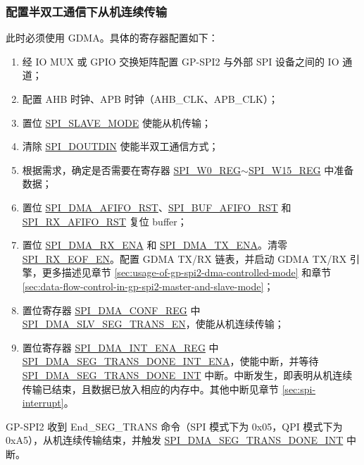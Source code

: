 \documentclass[main\_\_CN.tex]{subfiles}
\begin{document}
\subsubsection{配置半双工通信下从机连续传输}\label{sec:gp-spi2-slave-hd-seg-trans}

此时必须使用 GDMA。具体的寄存器配置如下：

\begin{enumerate}
    \item 经 IO MUX 或 GPIO 交换矩阵配置 GP-SPI2 与外部 SPI 设备之间的 IO 通道；
    \item 配置 AHB 时钟、APB 时钟（AHB\_CLK、APB\_CLK）；
    \item 置位 \hyperref[fielddesc:SPISLAVEMODE]{SPI\_SLAVE\_MODE} 使能从机传输； 
    \item 清除 \hyperref[fielddesc:SPIDOUTDIN]{SPI\_DOUTDIN} 使能半双工通信方式；
    \item 根据需求，确定是否需要在寄存器 \hyperref[regdesc:SPIW0REG]{SPI\_W0\_REG}$\sim$\hyperref[regdesc:SPIW15REG]{SPI\_W15\_REG} 中准备数据；
    \item 置位 \hyperref[fielddesc:SPIDMAAFIFORST]{SPI\_DMA\_AFIFO\_RST}、\hyperref[fielddesc:SPIBUFAFIFORST]{SPI\_BUF\_AFIFO\_RST} 和 \hyperref[fielddesc:SPIRXAFIFORST]{SPI\_RX\_AFIFO\_RST} 复位 buffer；
    \item 置位 \hyperref[fielddesc:SPIDMARXENA]{SPI\_DMA\_RX\_ENA} 和 \hyperref[fielddesc:SPIDMATXENA]{SPI\_DMA\_TX\_ENA}。清零 \hyperref[fielddesc:SPIRXEOFEN]{SPI\_RX\_EOF\_EN}。配置 GDMA TX/RX 链表，并启动 GDMA TX/RX 引擎，更多描述见章节 \ref{sec:usage-of-gp-spi2-dma-controlled-mode} 和章节 \ref{sec:data-flow-control-in-gp-spi2-master-and-slave-mode}；
    \item 置位寄存器 \hyperref[regdesc:SPIDMACONFREG]{SPI\_DMA\_CONF\_REG} 中 \hyperref[fielddesc:SPIDMASLVSEGTRANSEN]{SPI\_DMA\_SLV\_SEG\_TRANS\_EN}，使能从机连续传输；
    \item 置位寄存器 \hyperref[regdesc:SPIDMAINTENAREG]{SPI\_DMA\_INT\_ENA\_REG} 中 \hyperref[fielddesc:SPIDMASEGTRANSDONEINTENA]{SPI\_DMA\_SEG\_TRANS\_DONE\_INT\_ENA}，使能中断，并等待 \hyperref[int:SPIDMASEGTRANSDONEINT]{SPI\_DMA\_SEG\_TRANS\_DONE\_INT} 中断。中断发生，即表明从机连续传输已结束，且数据已放入相应的内存中。其他中断见章节 \ref{sec:spi-interrupt}。
\end{enumerate}

GP-SPI2 收到 End\_SEG\_TRANS 命令（SPI 模式下为 0x05，QPI 模式下为 0xA5），从机连续传输结束，并触发 \hyperref[int:SPIDMASEGTRANSDONEINT]{SPI\_DMA\_SEG\_TRANS\_DONE\_INT} 中断。
\end{document}
